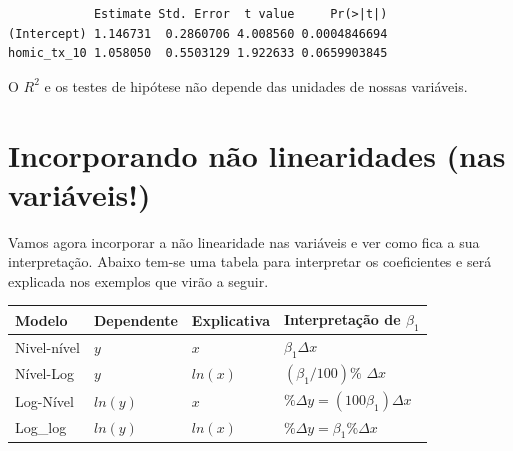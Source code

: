 \documentclass[
  letterpaper,
  DIV=11,
  numbers=noendperiod]{scrreprt}
\begin{document}
\begin{verbatim}
            Estimate Std. Error  t value     Pr(>|t|)
(Intercept) 1.146731  0.2860706 4.008560 0.0004846694
homic_tx_10 1.058050  0.5503129 1.922633 0.0659903845
\end{verbatim}

\begin{tcolorbox}[enhanced jigsaw, titlerule=0mm, colback=white, coltitle=black, opacityback=0, breakable, colbacktitle=quarto-callout-note-color!10!white, toprule=.15mm, colframe=quarto-callout-note-color-frame, toptitle=1mm, bottomtitle=1mm, opacitybacktitle=0.6, left=2mm, arc=.35mm, rightrule=.15mm, bottomrule=.15mm, leftrule=.75mm, title=\textcolor{quarto-callout-note-color}{\faInfo}\hspace{0.5em}{Importante}]

O \(R^2\) e os testes de hipótese não depende das unidades de nossas
variáveis.

\end{tcolorbox}

\section{Incorporando não linearidades (nas
variáveis!)}\label{incorporando-nuxe3o-linearidades-nas-variuxe1veis}

Vamos agora incorporar a não linearidade nas variáveis e ver como fica a
sua interpretação. Abaixo tem-se uma tabela para interpretar os
coeficientes e será explicada nos exemplos que virão a seguir.

\begin{longtable}[]{@{}
  >{\raggedright\arraybackslash}p{}
  >{\raggedright\arraybackslash}p{}
  >{\raggedright\arraybackslash}p{}
  >{\raggedright\arraybackslash}p{}@{}}
\toprule\noalign{}
\begin{minipage}[b]{\linewidth}\raggedright
Modelo
\end{minipage} & \begin{minipage}[b]{\linewidth}\raggedright
Dependente
\end{minipage} & \begin{minipage}[b]{\linewidth}\raggedright
Explicativa
\end{minipage} & \begin{minipage}[b]{\linewidth}\raggedright
Interpretação de \(\beta_1\)
\end{minipage} \\
\midrule\noalign{}
\endhead
\bottomrule\noalign{}
\endlastfoot
Nivel-nível & \(y\) & \(x\) & \(\beta_1 \Delta x\) \\
Nível-Log & \(y\) & \(ln(x)\) & \((\beta_1/100)\%\) \(\Delta x\) \\
Log-Nível & \(ln(y)\) & \(x\) &
\(\% \Delta y = (100 \beta_1) \Delta x\) \\
Log\_log & \(ln(y)\) & \(ln(x)\) &
\(\% \Delta y = \beta_1\% \Delta x\) \\
\end{longtable}
\end{document}
